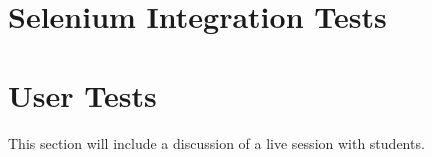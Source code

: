 \section{Selenium Integration Tests}
\section{User Tests}
This section will include a discussion of a live session with students.

%
%
%
%
%

%
%
%
%

